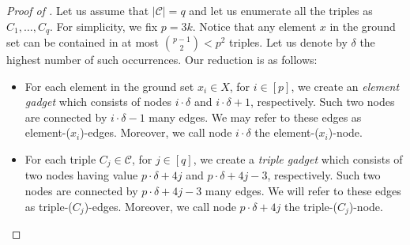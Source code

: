 \documentclass[a4paper]{article}
\newcommand{\modulus}[1]{\vert #1 \vert}
\begin{document}
\begin{proof}[Proof of ]
Let us assume that $\modulus{\mathcal{C}}= q$ and let us enumerate all the triples as $C_1, \dots, C_q$. For simplicity, we fix  $p=3k$. Notice that any element $x$ in the ground set can be contained in at most ${p-1 \choose 2} < p^2$ triples. Let us denote by $\delta$ the highest number of such occurrences. Our reduction is as follows:
%
\begin{itemize}
    \item For each element in the ground set $x_i\in X$, for $i\in [p]$, we create an \emph{element gadget} which consists of nodes $i\cdot \delta$ and $i\cdot\delta +1$, respectively. Such two nodes are connected by $i\cdot\delta -1 $ many edges. We may refer to these edges as element-($x_i$)-edges. Moreover, we call node $i\cdot\delta$ the element-($x_i$)-node.

    \item For each triple $C_j \in \mathcal{C}$, for $j\in [q]$, we create a \emph{triple gadget} which consists of two nodes having value $p\cdot\delta + 4j$  and $p\cdot\delta + 4j -3$, respectively. Such two nodes are connected by $p\cdot\delta + 4j -3$ many edges. We will refer to these edges as triple-($C_j$)-edges. Moreover, we call node $p\cdot\delta + 4j$ the triple-($C_j$)-node.


\end{itemize}
\end{proof}
\end{document}
